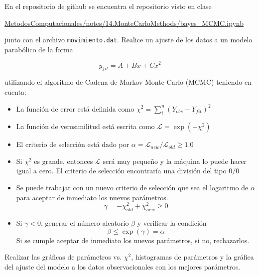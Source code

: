\documentclass[11pt,letterpaper]{exam}
\begin{document}
\begin{questions}


En el repositorio de github se encuentra el repositorio visto en clase

\href{https://github.com/ComputoCienciasUniandes/MetodosComputacionales/blob/master/notes/14.MonteCarloMethods/bayes_MCMC.ipynb}{MetodosComputacionales/notes/14.MonteCarloMethods/bayes\_MCMC.ipynb}

\noindent junto con el archivo \verb"movimiento.dat". Realice un ajuste de los datos a un modelo parabólico de la forma 

$$ y_{fit}= A + B x + C x^2$$

utilizando el algoritmo de Cadena de Markov Monte-Carlo (MCMC) teniendo en cuenta:
\begin{itemize}
 \item La funci\'on de error est\'a definida como $\chi^2 = \sum _i ^n \left( Y_{obs} - Y_{fit} \right)^2$
 \item La funci\'on de verosimilitud est\'a escrita como $\mathcal{L} = \exp(-\chi^2)$
 \item El criterio de selecci\'on est\'a dado por
       $\alpha=\mathcal{L}_{new} / \mathcal{L}_{old} \geq 1.0$
 \item Si $\chi^2$ es grande, entonces $\mathcal{L}$ ser\'a muy peque\~no 
       y la m\'aquina lo puede hacer igual a cero. El criterio de 
       selecci\'on encontrar\'ia una divisi\'on del tipo $0/0$
 \item Se puede trabajar con un nuevo criterio de selecci\'on 
       que sea el logaritmo de $\alpha$ para aceptar de inmediato
       los nuevos par\'ametros.
       $$ \gamma = -\chi^2_{old}+\chi^2_{new} \geq 0  $$
 \item Si $\gamma<0$, generar el n\'umero aleatorio $\beta$ y verificar la condici\'on
       $$ \beta \leq \exp(\gamma) = \alpha $$
       Si se cumple aceptar de inmediato los nuevos par\'ametros, si no, rechazarlos.
\end{itemize}

Realizar las gr\'aficas de par\'ametros vs. $\chi^2$, histogramas de par\'ametros
y la gr\'afica del ajuste del modelo a los datos observacionales con los
mejores par\'ametros.

\end{questions}
\end{document}

